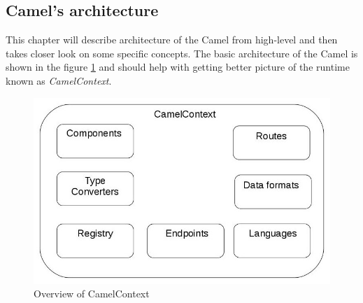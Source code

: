 \documentclass[12pt,final,oneside]{fithesis2}
\begin{document}
\subsection{Camel's architecture}
This chapter will describe architecture of the Camel from high-level and then takes closer look on some specific concepts. The basic architecture of the Camel is shown in the figure \ref{camelContext} and should help with getting better picture of the runtime known as \textit{CamelContext}.

\begin{figure}[!h]
\centering
\includegraphics[width=0.9\linewidth]{images/CamelContextCrop.jpg}
\caption{Overview of CamelContext}
\label{camelContext}
\end{figure}
\end{document}
